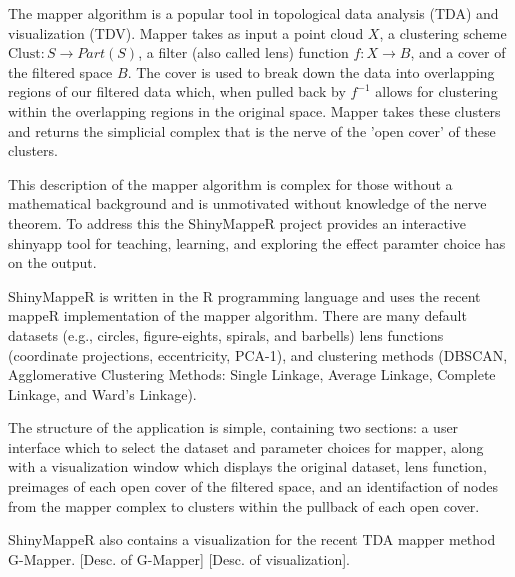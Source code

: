 The mapper algorithm is a popular tool in topological data analysis (TDA) and 
visualization (TDV). Mapper takes as input a point cloud $X$, a clustering 
scheme $\text{Clust}: S \to Part(S)$, a filter (also called lens) function 
$f: X \to B$, and a cover of the filtered space $B$. The cover is used to 
break down the data into overlapping regions of our filtered data which, 
when pulled back by $f^{-1}$ allows for clustering within the overlapping 
regions in the original space. Mapper takes these clusters and returns the 
simplicial complex that is the nerve of the 'open cover' of these clusters.

This description of the mapper algorithm is complex for those without a 
mathematical background and is unmotivated without knowledge of the nerve 
theorem. To address this the ShinyMappeR project provides an interactive
shinyapp tool for teaching, learning, and exploring the effect paramter 
choice has on the output. 

ShinyMappeR is written in the R programming language and uses the recent 
mappeR implementation of the mapper algorithm. There are many default 
datasets (e.g., circles, figure-eights, spirals, and barbells) lens 
functions (coordinate projections, eccentricity, PCA-1), and clustering 
methods (DBSCAN, Agglomerative Clustering Methods: Single Linkage, Average Linkage,
Complete Linkage, and Ward's Linkage).

The structure of the application is simple, containing two sections: a user 
interface which to select the dataset and parameter choices for mapper, 
along with a visualization window which displays the original dataset, lens function,  
preimages of each open cover of the filtered space, and an identifaction of nodes
from the mapper complex to clusters within the pullback of each open cover.

ShinyMappeR also contains a visualization for the recent TDA mapper method G-Mapper.
[Desc. of G-Mapper] [Desc. of visualization].
